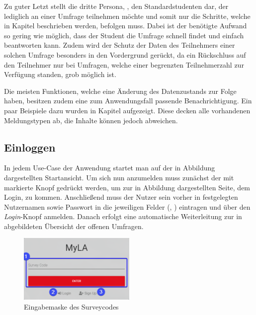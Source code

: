 Zu guter Letzt stellt die dritte Persona, \weigert, den Standardstudenten dar, der lediglich an einer Umfrage teilnehmen möchte und somit nur die Schritte, welche in Kapitel  beschrieben werden, befolgen muss.
Dabei ist der benötigte Aufwand so gering wie möglich, dass der Student die Umfrage schnell findet und einfach beantworten kann.
Zudem wird der Schutz der Daten des Teilnehmers einer solchen Umfrage besonders in den Vordergrund gerückt, da ein Rückschluss auf den Teilnehmer nur bei Umfragen, welche einer begrenzten Teilnehmerzahl zur Verfügung standen, grob möglich ist.

Die meisten Funktionen, welche eine Änderung des Datenzustands zur Folge haben, besitzen zudem eine zum Anwendungsfall passende Benachrichtigung.
Ein paar Beispiele dazu wurden in Kapitel  aufgezeigt.
Diese decken alle vorhandenen Meldungstypen ab, die Inhalte können jedoch abweichen.

\subsection{Einloggen}
\label{ssec:Einloggen}

In jedem Use-Case der Anwendung startet man auf der in Abbildung  dargestellten Startansicht.
Um sich nun anzumelden muss zunächst der mit \desTwo markierte Knopf gedrückt werden, um zur in Abbildung  dargestellten Seite, dem Login, zu kommen.
Anschließend muss der Nutzer sein vorher in  festgelegten Nutzernamen sowie Passwort in die jeweiligen Felder (\desOne, \desTwo) eintragen und über den \emph{Login}-Knopf anmelden.
Danach erfolgt eine automatische Weiterleitung zur in  abgebildeten Übersicht der offenen Umfragen.

\begin{figure}[H]
	\centering
	\includegraphics[width=0.5\textwidth, keepaspectratio]{img/guide/SurveyCode.png}
	\captionsetup{justification=centering, format=plain}
	\caption[Eingabemaske Surveycode]{Eingabemaske des Surveycodes \\\quelleScreenshot}
	\label{fig:EingabemaskeSurveycode}
\end{figure}

